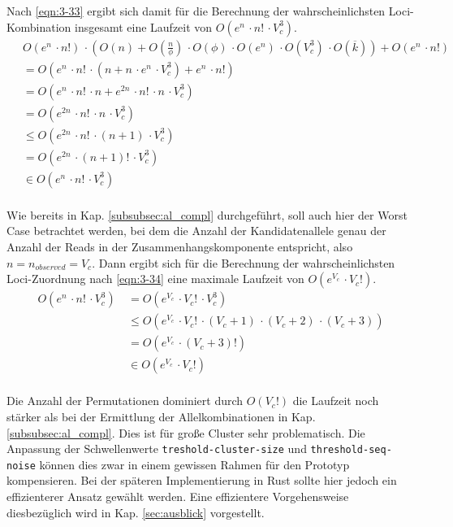 Nach \eqref{eqn:3-33} ergibt sich damit für die Berechnung der wahrscheinlichsten Loci-Kombination insgesamt eine Laufzeit von $ O(e^n \, \cdotp n! \, \cdotp V_{c}^3)$.
\begin{equation} \label{eqn:3-33}
\tag{3-33}
\begin{aligned}
&\ {}O(e^n \, \cdotp n!) \, \cdotp \left( O(n) + O\left( \frac{n}{\phi} \right) \, \cdotp O(\phi) \, \cdotp O(e^n)  \, \cdotp O(V_{c}^3) \, \cdotp O(\overline{k})\right) + O(e^n\, \cdotp n!) \\
&\ =O(e^n \, \cdotp n! \, \cdotp(n + n \, \cdotp e^n \, \cdotp V_{c}^3)+ e^n\, \cdotp n!)  \\
&\ =O(e^n \, \cdotp n! \, \cdotp n + e^{2n} \, \cdotp n! \, \cdotp n \, \cdotp V_{c}^3)\\
&\ =O(e^{2n} \, \cdotp n! \, \cdotp n \, \cdotp V_{c}^3)\\
&\ \leq O(e^{2n} \, \cdotp n! \, \cdotp (n + 1) \, \cdotp V_{c}^3)\\
&\ = O(e^{2n} \, \cdotp (n + 1)! \, \cdotp V_{c}^3)\\
&\ \in O(e^n \, \cdotp n! \, \cdotp V_{c}^3)\\
\end{aligned}
\end{equation}

Wie bereits in Kap. \ref{subsubsec:al_compl} durchgeführt, soll auch hier der Worst Case betrachtet werden, bei dem die Anzahl der Kandidatenallele genau der Anzahl der Reads in der Zusammenhangskomponente entspricht, also $ n = n_{observed} =V_{c} $. Dann ergibt sich für die Berechnung der wahrscheinlichsten Loci-Zuordnung nach \eqref{eqn:3-34} eine maximale Laufzeit von $ O(e^{V_{c}} \, \cdotp V_{c}!) $.
\begin{equation} \label{eqn:3-34}
\tag{3-34}
\begin{aligned}
O(e^n \, \cdotp n! \, \cdotp V_{c}^3)
&\ {}=O(e^{V_{c}} \, \cdotp V_{c}! \, \cdotp V_{c}^3)\\
&\ \leq O(e^{V_{c}} \, \cdotp V_{c}! \, \cdotp (V_{c} + 1)\, \cdotp (V_{c} + 2)\, \cdotp (V_{c} + 3))\\
&\ =  O(e^{V_{c}} \, \cdotp (V_{c} + 3)!)\\
&\ \in O(e^{V_{c}} \, \cdotp V_{c}!)\\
\end{aligned}
\end{equation}

Die Anzahl der Permutationen dominiert durch $ O(V_{c}!) $ die Laufzeit noch stärker als bei der Ermittlung der Allelkombinationen in Kap. \ref{subsubsec:al_compl}. Dies ist für große Cluster sehr problematisch. Die Anpassung der Schwellenwerte \lstinline|treshold-cluster-size| und \linebreak \lstinline|threshold-seq-noise| können dies zwar in einem gewissen Rahmen für den Prototyp kompensieren. Bei der späteren Implementierung in Rust sollte hier jedoch ein effizienterer Ansatz gewählt werden. Eine effizientere Vorgehensweise diesbezüglich wird in Kap. \ref{sec:ausblick} vorgestellt.
 
